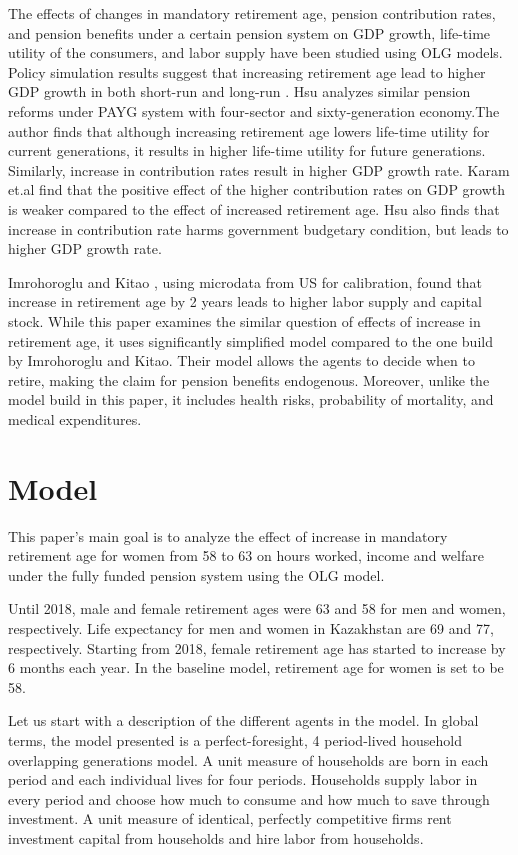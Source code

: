 \documentclass[ProjectUYA]{subfiles}
\begin{document}
The effects of changes in mandatory retirement age, pension contribution rates, and pension benefits under a certain pension system on GDP growth, life-time utility of the consumers, and labor supply have been studied using OLG models. Policy simulation results suggest that increasing retirement age lead to higher GDP growth in both short-run and long-run \cite{cournede}.  Hsu \cite{hsu} analyzes similar pension reforms under PAYG system with four-sector and sixty-generation economy.The author finds that although increasing retirement age lowers life-time utility for current generations, it results in higher life-time utility for future generations. Similarly, increase in contribution rates result in higher GDP growth rate. Karam et.al \cite{karam} find that the positive effect of the higher contribution rates on GDP growth is weaker compared to the effect of increased retirement age. Hsu \cite{hsu} also finds that increase in contribution rate harms government budgetary condition, but leads to higher GDP growth rate.

Imrohoroglu and Kitao \cite{imroh}, using microdata from US for calibration, found that increase in retirement age by 2 years leads to higher labor supply and capital stock. While this paper examines the similar question of effects of increase in retirement age, it uses significantly simplified model compared to the one build by Imrohoroglu and Kitao. Their model allows the agents to decide when to retire, making the claim for pension benefits endogenous. Moreover, unlike the model build in this paper, it includes health risks, probability of mortality, and medical expenditures.


\section{Model}
This paper's main goal is to analyze the effect of increase in mandatory retirement age for women from 58 to 63 on hours worked, income and welfare under the fully funded pension system using the OLG model.

Until 2018, male and female retirement ages were 63 and 58 for men and women, respectively. Life expectancy for men and women in Kazakhstan are 69 and 77, respectively. Starting from 2018, female retirement age has started to increase by 6 months each year. In the baseline model, retirement age for women is set to be 58. 

 Let us start with a description of the different agents in the model. In global terms, the model presented is a perfect-foresight, 4 period-lived household overlapping generations model. A unit measure 
 of households are born in each period and each individual lives for four periods. Households supply labor in every period and choose how much to consume and how much to save through investment. A unit measure of identical, perfectly competitive firms rent investment capital from households and hire labor from households. 
\end{document}
